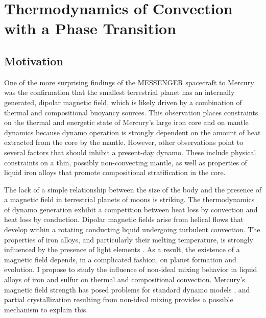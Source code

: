 \chapter{Thermodynamics of Convection with a Phase Transition}\label{chap5}


\section{Motivation}

One of the more surprising findings of the MESSENGER spacecraft to Mercury was
the confirmation that the smallest terrestrial planet has an internally
generated, dipolar magnetic field, which is likely driven by a combination of
thermal and compositional buoyancy sources. This observation places constraints
on the thermal and energetic state of Mercury’s large iron core and on mantle
dynamics because dynamo operation is strongly dependent on the amount of heat
extracted from the core by the mantle. However, other observations point to
several factors that should inhibit a present-day dynamo. These include
physical constraints on a thin, possibly non-convecting mantle, as well as
properties of liquid iron alloys that promote compositional stratification in
the core.

The lack of a simple relationship between the size of the body and the presence
of a magnetic field in terrestrial planets of moons is striking. The
thermodynamics of dynamo generation exhibit a competition between heat loss by
convection and heat loss by conduction.  Dipolar magnetic fields arise from
helical flows that develop within a rotating conducting liquid undergoing
turbulent convection. The properties of iron alloys, and particularly their
melting temperature, is strongly influenced by the presence of light elements
\citep{sanloup2000}. As a result, the existence of a magnetic field depends, in a
complicated fashion, on planet formation and evolution. I propose to study the
influence of non-ideal mixing behavior in liquid alloys of iron and sulfur on
thermal and compositional convection. Mercury's magnetic field strength has
posed problems for standard dynamo models \citep{Christensen2006,Stanley2005}, and
partial crystallization resulting from non-ideal mixing provides a possible
mechanism to explain this.

